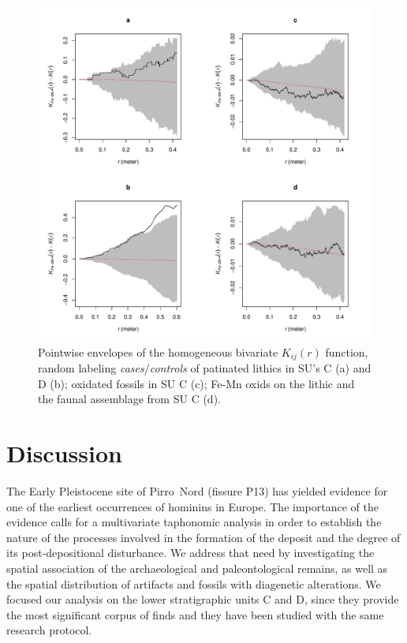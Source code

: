 \documentclass[review,authoryear]{elsarticle} %
\begin{document}
\begin{figure}
  \centering
  \includegraphics[width=1\textwidth]{../artwork/Fig9.pdf}
  \caption{Pointwise envelopes of the homogeneous bivariate $K_{ij}(r)$ function, random labeling \emph{cases}/\emph{controls} of patinated lithics in SU's C (a) and D (b); oxidated fossils in SU C (c); Fe-Mn oxids on the lithic and the faunal assemblage from SU C (d).}
  \label{fig:9}
\end{figure}

\section{Discussion}

The Early Pleistocene site of Pirro~Nord (fissure P13) has yielded evidence for one of the earliest occurrences of hominins in Europe. The importance of the evidence calls for a multivariate taphonomic analysis in order to establish the nature of the processes involved in the formation of the deposit and the degree of its post-depositional disturbance. We address that need by investigating the spatial association of the archaeological and paleontological remains, as well as the spatial distribution of artifacts and fossils with diagenetic alterations. We focused our analysis on the lower stratigraphic units C and D, since they provide the most significant corpus of finds and they have been studied with the same research protocol.
\end{document}
